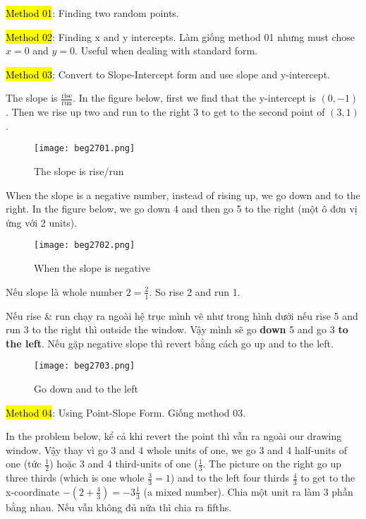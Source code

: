 \hl{Method 01}: Finding two random points.

\hl{Method 02}: Finding x and y intercepts. Làm giống method 01 nhưng must chose $x=0$ and $y=0$. Useful when dealing with standard form.


\hl{Method 03}: Convert to Slope-Intercept form and use slope and y-intercept.

The slope is $\frac{\text{rise}}{\text{run}}$. In the figure below, first we find that the y-intercept is $(0,-1)$. Then we rise up two and run to the right 3 to get to the second point of $(3,1)$.

\begin{figure}[htb!]
  \centering
  \texttt{[image: beg2701.png]}
  \caption{The slope is rise/run}
\end{figure}

\newpage

When the slope is a negative number, instead of rising up, we go down and to the right. In the figure below, we go down 4 and then go 5 to the right (một ô đơn vị ứng với 2 units).

\begin{figure}[htb!]
  \centering
  \texttt{[image: beg2702.png]}
  \caption{When the slope is negative}
\end{figure}

\vspace{0.5cm}

Nếu slope là whole number $2=\frac{2}{1}$. So rise 2 and run 1.


Nếu rise \& run chạy ra ngoài hệ trục mình vẽ như trong hình dưới nếu rise 5 and run 3 to the right thì outside the window. Vậy mình sẽ go \textbf{down} 5 and go 3 \textbf{to the left}. Nếu gặp negative slope thì revert bằng cách go up and to the left.

\begin{figure}[htb!]
  \centering
  \texttt{[image: beg2703.png]}
  \caption{Go down and to the left}
\end{figure}

\hl{Method 04}: Using Point-Slope Form. Giống method 03.

\vspace{8mm}

In the problem below, kể cả khi revert the point thì vẫn ra ngoài our drawing window. Vậy thay vì go 3 and 4 whole units of one, we go 3 and 4 half-units of one (tức $\frac{1}{2}$) hoặc 3 and 4 third-units of one ($\frac{1}{3}$. The picture on the right go up three thirds (which is one whole $\frac{3}{3}=1$) and to the left four thirds $\frac{4}{3}$ to get to the x-coordinate $-(2+\frac{4}{3})=-3\frac{1}{3}$ (a mixed number). Chia một unit ra làm 3 phần bằng nhau. Nếu vẫn không đủ nữa thì chia ra fifths.


